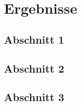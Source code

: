 \chapter{Ergebnisse}\label{chapter: Ergebnisse}

	\section{Abschnitt 1}
	
	\section{Abschnitt 2}
	
	\section{Abschnitt 3}